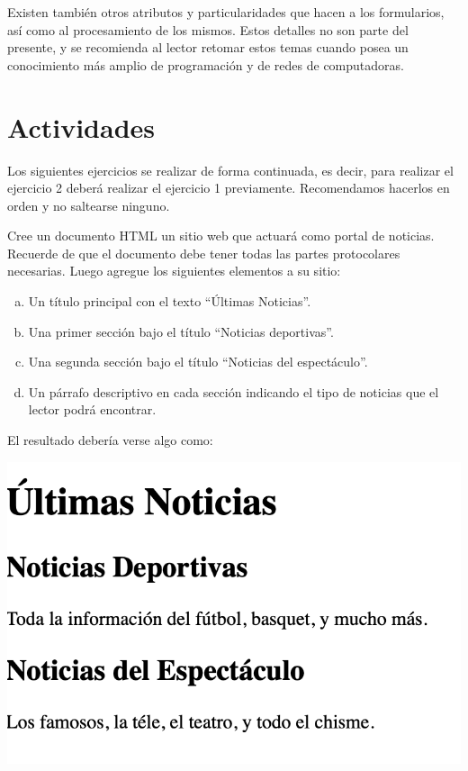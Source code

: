 Existen también otros atributos y particularidades que hacen a los formularios,
así como al procesamiento de los mismos. Estos detalles no son parte del presente,
y se recomienda al lector retomar estos temas cuando posea un conocimiento más
amplio de programación y de redes de computadoras.

\section{Actividades}

Los siguientes ejercicios se realizar de forma continuada, es decir, para
realizar el ejercicio 2 deberá realizar el ejercicio 1 previamente. Recomendamos
hacerlos en orden y no saltearse ninguno.

\begin{exercise}
Cree un documento HTML un sitio web que actuará como portal de noticias.
Recuerde de que el documento debe tener todas las partes protocolares
necesarias. Luego agregue los siguientes elementos a su sitio:
\begin{enumerate}[a)]
  \item Un título principal con el texto ``Últimas Noticias''.
  \item Una primer sección bajo el título ``Noticias deportivas''.
  \item Una segunda sección bajo el título ``Noticias del espectáculo''.
  \item Un párrafo descriptivo en cada sección indicando el tipo de noticias que
    el lector podrá encontrar.
\end{enumerate}

El resultado debería verse algo como:

\includegraphics[scale=0.5]{anexos/html/imagenes/diario_1.png}
\end{exercise}

